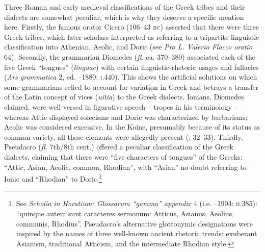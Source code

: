 Three Roman and early medieval classifications of the Greek tribes and their dialects are somewhat peculiar, which is why they deserve a specific mention here. Firstly, the famous orator Cicero (106–43 \textsc{bc}) asserted that there were three Greek tribes, which later scholars interpreted as referring to a tripartite linguistic classification into Athenian, Aeolic, and Doric (see \textit{Pro L. Valerio Flacco oratio} 64). Secondly, the grammarian Diomedes (\textit{fl.} ca. 370–380) associated each of the five Greek “tongues” (\textit{linguae}) with certain linguistic-rhetoric usages and fallacies (\textit{Ars grammatica} 2, ed. \citealt{Keil1855}–1880: \textsc{i}.440). This shows the artificial solutions on which some grammarians relied to account for variation in Greek and betrays a transfer of the Latin concept of vices (\textit{uitia}) to the Greek dialects. Ionians, Diomedes claimed, were well-versed in figurative speech – tropes in his terminology – whereas Attic displayed solecisms and Doric was characterized by barbarisms; Aeolic was considered excessive. In the Koine, presumably because of its status as common variety, all these elements were allegedly present (\citealt{Consani1991}: 32–33). Thirdly, Pseudacro (\textit{fl.} 7th/8th cent.) offered a peculiar classification of the Greek dialects, claiming that there were “five characters of tongues” of the Greeks: “Attic, Asian, Aeolic, common, Rhodian”, with “Asian” no doubt referring to Ionic and “Rhodian” to Doric.\footnote{{See} {\textit{Scholia in Horatium: Glossarum “gamma” appendix}} {4 (i.e. \citealt{Pseudacro1902}–1904:} {\textsc{ii.}}{385): “quinque autem sunt caracteres sermonum: Atticus, Asianus, Aeolius, communis, Rhodius{”.}} Pseudacro’s alternative glottonymic designations were inspired by the names of three well-known ancient rhetoric trends: exuberant Asianism, traditional Atticism, and the intermediate Rhodian style.

}
